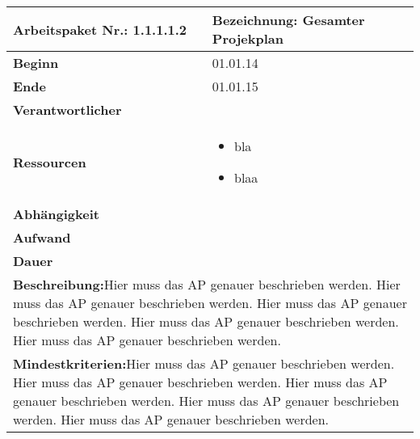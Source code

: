 \documentclass[fontsize=12pt,paper=a4,twoside]{scrartcl}
\begin{document}
 \begin{tabular}{|p{5.3cm}|p{9.7cm}|}\hline
   \textbf{Arbeitspaket Nr.:} 1.1.1.1.2 & \textbf{Bezeichnung:} Gesamter Projekplan\\ \hline \hline
   \textbf{Beginn} & 01.01.14\\ \hline
   \textbf{Ende} & 01.01.15\\ \hline
   \textbf{Verantwortlicher} & \\ \hline
   \textbf{Ressourcen} & \begin{itemize}
   \item bla
   \item blaa
\end{itemize}    \\ \hline
\textbf{Abhängigkeit} &\\ \hline
 \textbf{Aufwand} & \\ \hline
 \textbf{Dauer} & \\ \hline
   \multicolumn{2}{|p{15cm}|}{\textbf{Beschreibung:}\newline  Hier muss das AP genauer beschrieben werden. Hier muss das AP genauer beschrieben werden. Hier muss das AP genauer beschrieben werden. Hier muss das AP genauer beschrieben werden. Hier muss das AP genauer beschrieben werden. }\\ \hline
    \multicolumn{2}{|p{15cm}|}{\textbf{Mindestkriterien:}\newline  Hier muss das AP genauer beschrieben werden. Hier muss das AP genauer beschrieben werden. Hier muss das AP genauer beschrieben werden. Hier muss das AP genauer beschrieben werden. Hier muss das AP genauer beschrieben werden. }\\ \hline
 \end{tabular}
 \begin{verbatim}
 \end{verbatim}
\end{document}

